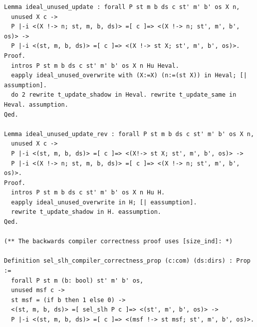 \documentclass[12pt]{report}
\begin{document}
\begin{verbatim}
Lemma ideal_unused_update : forall P st m b ds c st' m' b' os X n,
  unused X c ->
  P |-i <(X !-> n; st, m, b, ds)> =[ c ]=> <(X !-> n; st', m', b', os)> ->
  P |-i <(st, m, b, ds)> =[ c ]=> <(X !-> st X; st', m', b', os)>.
Proof.
  intros P st m b ds c st' m' b' os X n Hu Heval.
  eapply ideal_unused_overwrite with (X:=X) (n:=(st X)) in Heval; [| assumption].
  do 2 rewrite t_update_shadow in Heval. rewrite t_update_same in Heval. assumption.
Qed.

Lemma ideal_unused_update_rev : forall P st m b ds c st' m' b' os X n,
  unused X c ->
  P |-i <(st, m, b, ds)> =[ c ]=> <(X!-> st X; st', m', b', os)> ->
  P |-i <(X !-> n; st, m, b, ds)> =[ c ]=> <(X !-> n; st', m', b', os)>.
Proof.
  intros P st m b ds c st' m' b' os X n Hu H.
  eapply ideal_unused_overwrite in H; [| eassumption].
  rewrite t_update_shadow in H. eassumption.
Qed.

(** The backwards compiler correctness proof uses [size_ind]: *)

Definition sel_slh_compiler_correctness_prop (c:com) (ds:dirs) : Prop :=
  forall P st m (b: bool) st' m' b' os,
  unused msf c ->
  st msf = (if b then 1 else 0) ->
  <(st, m, b, ds)> =[ sel_slh P c ]=> <(st', m', b', os)> ->
  P |-i <(st, m, b, ds)> =[ c ]=> <(msf !-> st msf; st', m', b', os)>.


\end{verbatim}
\end{document}
